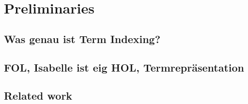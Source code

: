 \chapter{Preliminaries}
\section{Was genau ist Term Indexing?}
\section{FOL, Isabelle ist eig HOL, Termrepräsentation}
\section{Related work}

